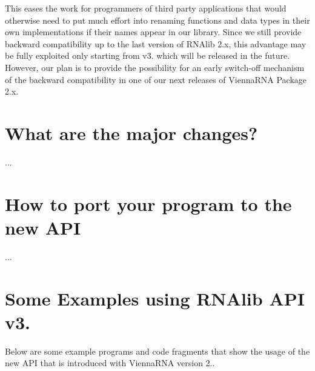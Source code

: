 This eases the work for programmers of third party applications that would otherwise need to put much effort into renaming functions and data types in their own implementations if their names appear in our library. Since we still provide backward compatibility up to the last version of R\-N\-Alib 2.\-x, this advantage may be fully exploited only starting from v3. which will be released in the future. However, our plan is to provide the possibility for an early switch-\/off mechanism of the backward compatibility in one of our next releases of Vienna\-R\-N\-A Package 2.\-x.\hypertarget{newAPI_newAPI_changes}{}\section{What are the major changes?}\label{newAPI_newAPI_changes}
...\hypertarget{newAPI_newAPI_porting}{}\section{How to port your program to the new A\-P\-I}\label{newAPI_newAPI_porting}
...\hypertarget{newAPI_newAPI_examples}{}\section{Some Examples using R\-N\-Alib A\-P\-I v3.}\label{newAPI_newAPI_examples}
Below are some example programs and code fragments that show the usage of the new A\-P\-I that is introduced with Vienna\-R\-N\-A version 2..


